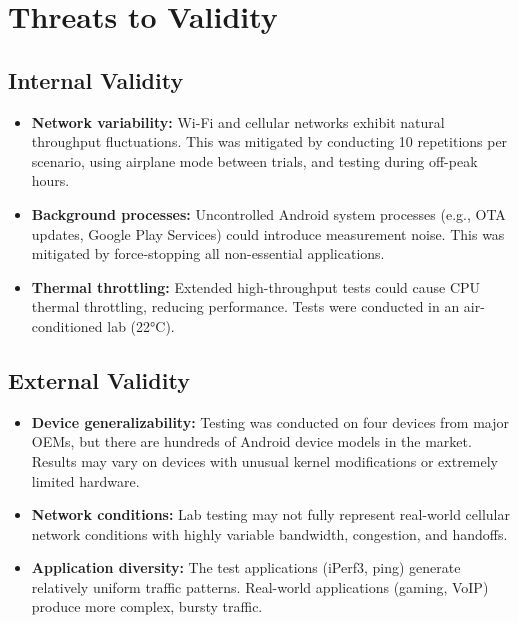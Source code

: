\section{Threats to Validity}
\label{sec:threats}

\subsection{Internal Validity}

\begin{itemize}[noitemsep]
    \item \textbf{Network variability:} Wi-Fi and cellular networks exhibit natural throughput fluctuations. This was mitigated by conducting 10 repetitions per scenario, using airplane mode between trials, and testing during off-peak hours.
    \item \textbf{Background processes:} Uncontrolled Android system processes (e.g., OTA updates, Google Play Services) could introduce measurement noise. This was mitigated by force-stopping all non-essential applications.
    \item \textbf{Thermal throttling:} Extended high-throughput tests could cause CPU thermal throttling, reducing performance. Tests were conducted in an air-conditioned lab (22°C).
\end{itemize}

\subsection{External Validity}

\begin{itemize}[noitemsep]
    \item \textbf{Device generalizability:} Testing was conducted on four devices from major OEMs, but there are hundreds of Android device models in the market. Results may vary on devices with unusual kernel modifications or extremely limited hardware.
    \item \textbf{Network conditions:} Lab testing may not fully represent real-world cellular network conditions with highly variable bandwidth, congestion, and handoffs.
    \item \textbf{Application diversity:} The test applications (iPerf3, ping) generate relatively uniform traffic patterns. Real-world applications (gaming, VoIP) produce more complex, bursty traffic.
\end{itemize}


